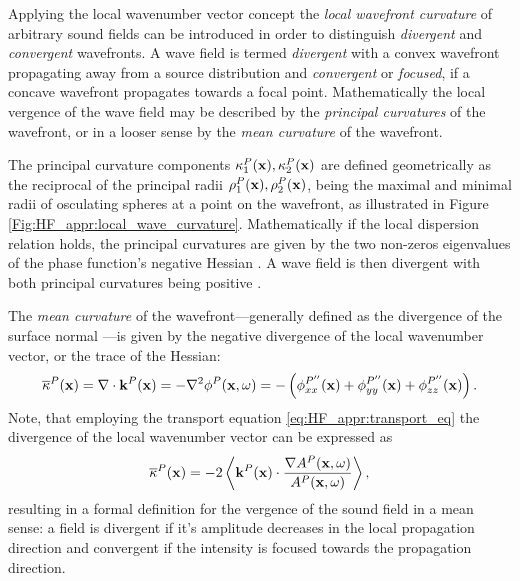 Applying the local wavenumber vector concept the \emph{local wavefront curvature} of arbitrary sound fields can be introduced in order to distinguish \emph{divergent} and \emph{convergent} wavefronts.
A wave field is termed \emph{divergent} with a convex wavefront propagating away from a source distribution and \emph{convergent} or \emph{focused}, if a concave wavefront propagates towards a focal point.
Mathematically the local vergence of the wave field may be described by the \emph{principal curvatures} of the wavefront, or in a looser sense by the \emph{mean curvature} of the wavefront.

The principal curvature components $\kappa_1^P(\mathbf{x}),\kappa_2^P(\mathbf{x})$ are defined geometrically as the reciprocal of the principal radii $\rho_1^P(\mathbf{x}), \rho_2^P(\mathbf{x})$, being the maximal and minimal radii of osculating spheres at a point on the wavefront, as illustrated in Figure \ref{Fig:HF_appr:local_wave_curvature}.
Mathematically if the local dispersion relation holds, the principal curvatures are given by the two non-zeros eigenvalues of the phase function's negative Hessian \cite{Hartmann1999, Hartmann2001}.
A wave field is then divergent with both principal curvatures being positive \cite{HF_and_Pulse_Scattering1992, Bleistein1984, Arnold1986}.

The \emph{mean curvature} of the wavefront---generally defined as the divergence of the surface normal \cite{Goldman2005}---is given by the negative divergence of the local wavenumber vector, or the trace of the Hessian:
%
\begin{equation}
\overline{\kappa}^P(\mathbf{x}) = \nabla \cdot \mathbf{k}^P(\mathbf{x}) = -\nabla^2 \phi^P(\mathbf{x},\omega) = -\left(  \phi^{P''}_{xx}(\mathbf{x}) + \phi^{P''}_{yy}(\mathbf{x}) + \phi^{P''}_{zz}(\mathbf{x}) \right).
\label{eq:HF_appr:curvature}
\end{equation}
Note, that employing the transport equation \eqref{eq:HF_appr:transport_eq} the divergence of the local wavenumber vector can be expressed as
\begin{equation}
\overline{\kappa}^P(\mathbf{x}) = -2 \left< \mathbf{k}^P(\mathbf{x})\cdot \frac{ \nabla A^P(\mathbf{x},\omega) }{A^P(\mathbf{x},\omega)}\right>,
\end{equation}
resulting in a formal definition for the vergence of the sound field in a mean sense: a field is divergent if it's amplitude decreases in the local propagation direction and convergent if the intensity is focused towards the propagation direction.

